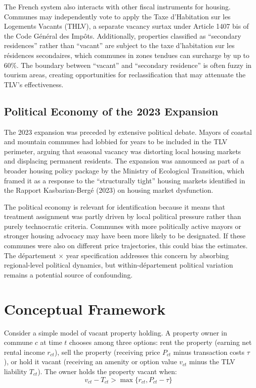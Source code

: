 \documentclass[12pt]{article}
\begin{document}
The French system also interacts with other fiscal instruments for housing. Communes may independently vote to apply the Taxe d'Habitation sur les Logements Vacants (THLV), a separate vacancy surtax under Article 1407 bis of the Code G\'en\'eral des Imp\^ots. Additionally, properties classified as ``secondary residences'' rather than ``vacant'' are subject to the taxe d'habitation sur les r\'esidences secondaires, which communes in zones tendues can surcharge by up to 60\%. The boundary between ``vacant'' and ``secondary residence'' is often fuzzy in tourism areas, creating opportunities for reclassification that may attenuate the TLV's effectiveness.

\subsection{Political Economy of the 2023 Expansion}

The 2023 expansion was preceded by extensive political debate. Mayors of coastal and mountain communes had lobbied for years to be included in the TLV perimeter, arguing that seasonal vacancy was distorting local housing markets and displacing permanent residents. The expansion was announced as part of a broader housing policy package by the Ministry of Ecological Transition, which framed it as a response to the ``structurally tight'' housing markets identified in the Rapport Kasbarian-Bergé (2023) on housing market dysfunction.

The political economy is relevant for identification because it means that treatment assignment was partly driven by local political pressure rather than purely technocratic criteria. Communes with more politically active mayors or stronger housing advocacy may have been more likely to be designated. If these communes were also on different price trajectories, this could bias the estimates. The d\'epartement $\times$ year specification addresses this concern by absorbing regional-level political dynamics, but within-d\'epartement political variation remains a potential source of confounding.


\section{Conceptual Framework}

Consider a simple model of vacant property holding. A property owner in commune $c$ at time $t$ chooses among three options: rent the property (earning net rental income $r_{ct}$), sell the property (receiving price $P_{ct}$ minus transaction costs $\tau$), or hold it vacant (receiving an amenity or option value $v_{ct}$ minus the TLV liability $T_{ct}$). The owner holds the property vacant when:
\begin{equation}
    v_{ct} - T_{ct} > \max\{r_{ct}, P_{ct} - \tau\}
\end{equation}
\end{document}
